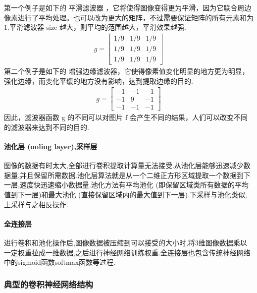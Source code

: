 第一个例子是如下的 平滑滤波器 ，它将使得图像变得更为平滑，因为它联合周边像素进行了平均处理。也可以改为更大的矩阵，不过需要保证矩阵的所有元素和为1.平滑滤波器 size 越大，则平均的范围越大，平滑效果越强.
\begin{align*}
  g = \left[
  \begin{array}{ccc}
    1/9 & 1/9 & 1/9 \\
    1/9 & 1/9 & 1/9 \\
    1/9 & 1/9 & 1/9 
  \end{array}
\right]
\end{align*}
第二个例子是如下的 增强边缘滤波器，它使得像素值变化明显的地方更为明显，强化边缘，而变化平缓的地方没有影响，达到提取边缘的目的.
\begin{align*}
  g = \left[
  \begin{array}{ccc}
    -1 & -1 & -1 \\
    -1 & 9 & -1 \\
    -1 & -1 & -1 
  \end{array}
                \right]
\end{align*}
因此，滤波器函数 g 的不同可以对图片 f 会产生不同的结果，人们可以改变不同的滤波器来达到不同的目的.


\paragraph{池化层 (ooling layer),采样层}
图像的数据有时太大,全部进行卷积提取计算量无法接受.从池化层能够迅速减少数据量,并且保留所需数据.池化层算法就是从一个二维正方形区域提取一个数据到下一层,速度快迅速缩小数据量.池化方法有平均池化 (即保留区域类所有数据的平均值到下一层)和最大池化 (直接保留区域内的最大值到下一层).下采样与池化类似,上采样与之相反操作.

\paragraph{全连接层}

进行卷积和池化操作后,图像数据被压缩到可以接受的大小时,将3维图像数据乘以一定权重拉成一维数据,之后进行神经网络训练权重.全连接层也包含传统神经网络中的sigmoid函数softmax函数等过程.


\subsubsection{典型的卷积神经网络结构}

